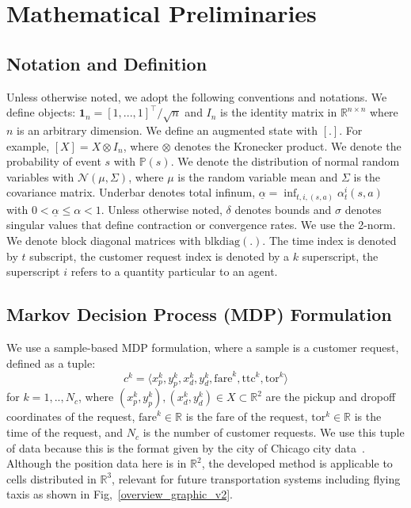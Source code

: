 \documentclass[journal]{IEEEtran}
\newcommand{\ttc}{\mathrm{ttc}}
\newcommand{\tor}{\mathrm{tor}}
\begin{document}
\section{Mathematical Preliminaries} \label{sec_math_prelim}
\subsection{Notation and Definition}
Unless otherwise noted, we adopt the following conventions and notations. 
    We define objects: $\boldsymbol{1}_n = [1,...,1]^\intercal / \sqrt{n}$ and $I_n$ is the identity matrix in $\mathbb{R}^{n\times n}$ where $n$ is an arbitrary dimension.
    We define an augmented state with $[.]$. For example, $[X] = X \otimes I_{n}$, where $\otimes$ denotes the Kronecker product. 
    We denote the probability of event $s$ with $\mathbb{P}(s)$. 
    We denote the distribution of normal random variables with $\mathcal{N}(\mu, \Sigma)$, where $\mu$ is the random variable mean and $\Sigma$ is the covariance matrix. 
    Underbar denotes total infinum, $\underline{\alpha} = \inf_{t,i,(s,a)} \alpha^i_t(s,a)$ with  $0 < \underline{\alpha} \leq \alpha < 1$.
    Unless otherwise noted, $\delta$ denotes bounds and $\sigma$ denotes singular values that define contraction or convergence rates.
    We use the 2-norm.
    We denote block diagonal matrices with $\mathrm{blkdiag}(.)$. 
    The time index is denoted by $t$ subscript, the customer request index is denoted by a $k$ superscript, the superscript $i$ refers to a quantity particular to an agent.

\subsection{Markov Decision Process (MDP) Formulation}
We use a sample-based MDP formulation, where a sample is a customer request, defined as a tuple: $$c^k = \langle x^k_p, y^k_p, x^k_d, y^k_d, \mathrm{fare}^k, \ttc^k, \tor^k\rangle$$ for $k = 1,..,N_c$, where $(x^k_p,y^k_p), (x^k_d, y^k_d) \in X \subset \mathbb{R}^2$ are the pickup and dropoff coordinates of the request, $\mathrm{fare}^k \in \mathbb{R}$ is the fare of the request, $\tor^k \in \mathbb{R}$ is the time of the request, and $N_c$ is the number of customer requests. We use this tuple of data because this is the format given by the city of Chicago city data~\cite{chicagoData}. Although the position data here is in $\mathbb{R}^2$, the developed method is applicable to cells distributed in $\mathbb{R}^3$, relevant for future transportation systems including flying taxis as shown in Fig,~\ref{overview_graphic_v2}. 
\end{document}
